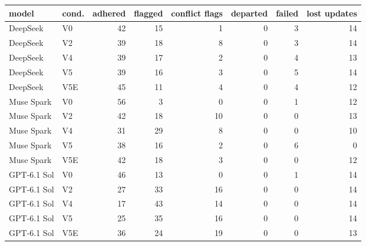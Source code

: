 \begin{tabular}{llrrrrrr}
\toprule
model & cond. & adhered & flagged & conflict flags & departed & failed & lost updates \\
\midrule
DeepSeek & V0 & 42 & 15 & 1 & 0 & 3 & 14 \\
DeepSeek & V2 & 39 & 18 & 8 & 0 & 3 & 14 \\
DeepSeek & V4 & 39 & 17 & 2 & 0 & 4 & 13 \\
DeepSeek & V5 & 39 & 16 & 3 & 0 & 5 & 14 \\
DeepSeek & V5E & 45 & 11 & 4 & 0 & 4 & 12 \\
Muse Spark & V0 & 56 & 3 & 0 & 0 & 1 & 12 \\
Muse Spark & V2 & 42 & 18 & 10 & 0 & 0 & 13 \\
Muse Spark & V4 & 31 & 29 & 8 & 0 & 0 & 10 \\
Muse Spark & V5 & 38 & 16 & 2 & 0 & 6 & 0 \\
Muse Spark & V5E & 42 & 18 & 3 & 0 & 0 & 12 \\
GPT-6.1 Sol & V0 & 46 & 13 & 0 & 0 & 1 & 14 \\
GPT-6.1 Sol & V2 & 27 & 33 & 16 & 0 & 0 & 14 \\
GPT-6.1 Sol & V4 & 17 & 43 & 14 & 0 & 0 & 14 \\
GPT-6.1 Sol & V5 & 25 & 35 & 16 & 0 & 0 & 14 \\
GPT-6.1 Sol & V5E & 36 & 24 & 19 & 0 & 0 & 13 \\
\bottomrule
\end{tabular}
